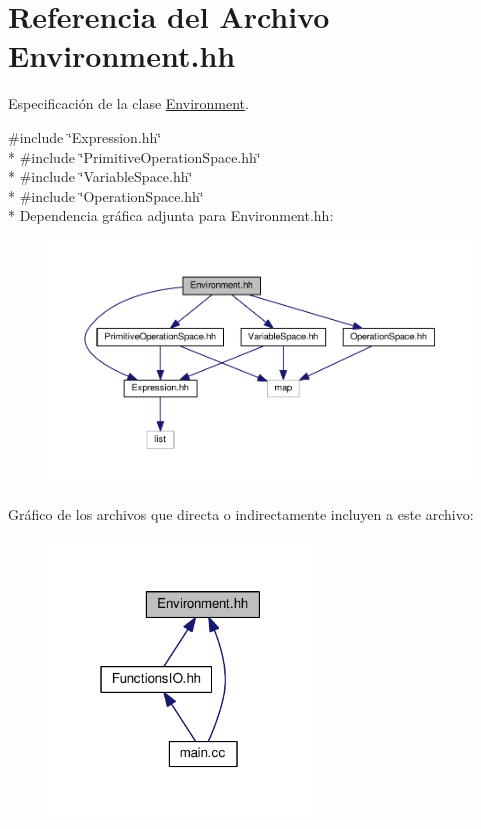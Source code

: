 \hypertarget{_environment_8hh}{}\section{Referencia del Archivo Environment.\+hh}
\label{_environment_8hh}


Especificación de la clase \hyperlink{class_environment}{Environment}.  


{\ttfamily \#include \char`\"{}Expression.\+hh\char`\"{}}\\*
{\ttfamily \#include \char`\"{}Primitive\+Operation\+Space.\+hh\char`\"{}}\\*
{\ttfamily \#include \char`\"{}Variable\+Space.\+hh\char`\"{}}\\*
{\ttfamily \#include \char`\"{}Operation\+Space.\+hh\char`\"{}}\\*
Dependencia gráfica adjunta para Environment.\+hh\+:\nopagebreak
\begin{figure}[H]
\begin{center}
\leavevmode
\includegraphics[width=350pt]{_environment_8hh__incl}
\end{center}
\end{figure}
Gráfico de los archivos que directa o indirectamente incluyen a este archivo\+:\nopagebreak
\begin{figure}[H]
\begin{center}
\leavevmode
\includegraphics[width=199pt]{_environment_8hh__dep__incl}
\end{center}
\end{figure}
